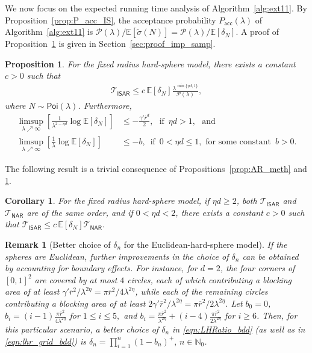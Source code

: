 \documentclass[11pt]{article}
\newcommand{\ee}{\mathbb{E}}
\newcommand{\rbdd}{\overline{r}}
\newcommand{\mbb}{\mathbb}
\newcommand{\lt}{\left}
\newcommand{\rt}{\right}
\newcommand{\wt}{\widetilde}
\newcommand{\pois}{\mathsf{Poi}}
\newcommand{\pno}{\mathcal{P}(\lambda)}
\newcommand{\comAR}{\mathcal{T}_{\mathsf{NAR}}}
\newtheorem{proposition}{Proposition}
\newtheorem{remark}{Remark}
\newtheorem{corollary}{Corollary}
\begin{document}
We now focus on the expected running time analysis of Algorithm~\ref{alg:ext11}. By Proposition~\ref{prop:P_acc_IS}, the acceptance probability 
$P_{\mathsf{acc}}(\lambda)$ of Algorithm~\ref{alg:ext11} is 
$\pno/\ee[\wt \sigma(N)] = \pno/\ee[\delta_N].$
A proof of Proposition~\ref{prop:imp_samp} is given in Section~\ref{sec:proof_imp_samp}.
\begin{proposition}
\label{prop:imp_samp}
 For the fixed radius hard-sphere model, there exists a constant $c > 0$  such that
 \begin{align}
 \label{eqn:ISAR_cost_grid}
  \mathcal{T}_{\mathsf{ISAR}} \leq c \, \ee\lt[ \delta_N\rt] \frac{\lambda^{\min\{\eta d, 1\}}}{\pno},
 \end{align}
where $N \sim \pois(\lambda)$.
Furthermore,
 \begin{align*}
  \limsup_{\lambda \nearrow \infty }\lt[ \frac{1}{\lambda^{2 - \eta d}} \log \ee\lt[\delta_N\rt] \rt] &\leq  - \frac{\gamma' \rbdd^d}{2}, \,\, \text{ if }\, \eta d > 1, \,\, \text{ and} \\
  \limsup_{\lambda \nearrow \infty }\lt[ \frac{1}{\lambda} \log \ee\lt[\delta_N\rt] \rt] & \leq - b,  \, \text{ if }\, 0 < \eta d \leq 1, \text{ for some constant }\, b > 0.
 \end{align*}
\end{proposition}
The following result is a trivial consequence of Propositions~\ref{prop:AR_meth} and \ref{prop:imp_samp}.

\begin{corollary}
\label{cor:TIS_vs_TAR}
For the fixed radius hard-sphere model, if $\eta d \geq 2$, both $\mathcal{T}_{\mathsf{ISAR}}$ and  $\comAR$ are of the same order, and  if $0 < \eta d < 2$, there exists a constant $c > 0$ such that
 $\displaystyle\mathcal{T}_{\mathsf{ISAR}} \leq c\,  \ee\lt[\delta_N\rt] \comAR.$
\end{corollary}

\begin{remark}[Better choice of $\delta_n$ for the Euclidean-hard-sphere model]
\label{rem:ChSigOneDim}
\normalfont
If {the spheres} are Euclidean, further improvements in the choice of $\delta_n$ can be obtained by accounting for  boundary effects. For instance, for $d=2$, the four corners of $[0,1]^2$ are covered by at most $4$ circles, each of which contributing a blocking area of at least $\gamma'\rbdd^2/\lambda^{2 \eta} = \pi\rbdd^2/4\lambda^{2 \eta}$, while each of the remaining circles contributing a blocking area of at least $2\gamma'\rbdd^2/\lambda^{2 \eta} = \pi\rbdd^2/2\lambda^{2 \eta}$. Let  $b_0 = 0$, $b_i =   (i - 1)\frac{\pi \rbdd^2}{4 \lambda^{2\eta}}$ for $1\leq i \leq 5,$ and $b_i = \frac{\pi \rbdd^2}{\lambda^{2\eta}} + (i-4)\frac{\pi\rbdd^2}{2\lambda^{2 \eta}}$ for $i \geq 6$.
Then, for this particular scenario, a better choice of $\delta_n$ in \eqref{eqn:LHRatio_bdd} (as well as in \eqref{eqn:lhr_grid_bdd}) is 
$\delta_n = \prod_{i=1}^{n} \lt( 1 - b_n  \rt)^+,\, n \in \mbb{N}_0$.
\end{remark}
\end{document}
